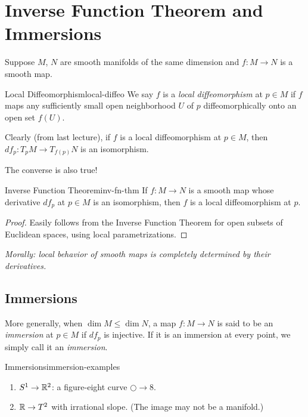 
\section{Inverse Function Theorem and Immersions}

Suppose $M$, $N$ are smooth manifolds of the same dimension and $f \colon M \to N$ is a smooth map.

\begin{definition}{Local Diffeomorphism}{local-diffeo}
    We say $f$ is a \emph{local diffeomorphism} at $p \in M$ if $f$ maps any sufficiently small open neighborhood $U$ of $p$ diffeomorphically onto an open set $f(U)$.
\end{definition}

Clearly (from last lecture), if $f$ is a local diffeomorphism at $p \in M$, then $df_p \colon T_p M \to T_{f(p)} N$ is an isomorphism.

The converse is also true!

\begin{theorem}{Inverse Function Theorem}{inv-fn-thm}
    If $f \colon M \to N$ is a smooth map whose derivative $df_p$ at $p \in M$ is an isomorphism, then $f$ is a local diffeomorphism at $p$.
\end{theorem}

\begin{proof}
    Easily follows from the Inverse Function Theorem for open subsets of Euclidean spaces, using local parametrizations.
\end{proof}

\emph{Morally: local behavior of smooth maps is completely determined by their derivatives.}

\subsection{Immersions}

More generally, when $\dim M \leq \dim N$, a map $f \colon M \to N$ is said to be an \emph{immersion} at $p \in M$ if $df_p$ is injective. If it is an immersion at every point, we simply call it an \emph{immersion}.

\begin{example}{Immersions}{immersion-examples}
    \begin{enumerate}
        \item $S^1 \to \mathbb{R}^2$: a figure-eight curve $\bigcirc \to 8$.
        \item $\mathbb{R} \to T^2$ with irrational slope. (The image may not be a manifold.)
    \end{enumerate}
\end{example}

